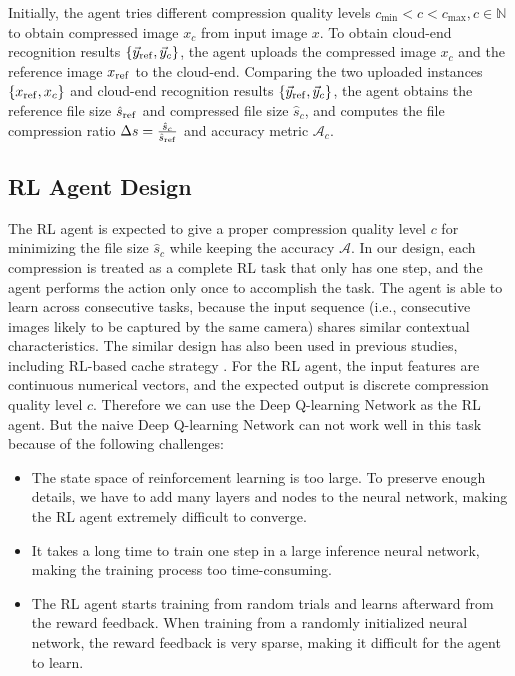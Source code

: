 Initially, the agent tries different compression quality levels $ c_{\min} < c < c_{\max}, c \in \mathbb{N} $ to obtain compressed image $ x_c $ from input image $ x $. To obtain cloud-end recognition results $ \{\vec{y}_{\rm ref}, \vec{y}_c\} $, the agent uploads the compressed image $ x_c $ and the reference image $ x_{\rm ref} $ to the cloud-end. Comparing the two uploaded instances $ \{x_{\rm ref}, x_c\} $ and cloud-end recognition results $ \{\vec{y}_{\rm ref}, \vec{y}_c\} $, the agent obtains the reference file size {\color{revise2}$ \hat{s}_{\rm ref} $} and compressed file size {\color{revise2}$ \hat{s}_c $}, and computes the file compression ratio {\color{revise2}$ \Delta s = \frac{\hat{s}_c}{\hat{s}_{\rm ref}} $} and accuracy metric $ \mathcal{A}_c $.

\subsection{RL Agent Design}

The RL agent is expected to give a proper compression quality level $ c $ for minimizing the file size {\color{revise2}$ \hat{s}_c $} while keeping the accuracy $ \mathcal{A} $. {\color{revise2} In our design, each compression is treated as a complete RL task that only has one step, and the agent performs the action only once to accomplish the task. The agent is able to learn across consecutive tasks, because the input sequence (i.e., consecutive images likely to be captured by the same camera) shares similar contextual characteristics. The similar design has also been used in previous studies, including RL-based cache strategy \cite{wang2020intelligent_RL,zhong2018deep_RL,sadeghi2019deep_RL}.} For the RL agent, the input features are continuous numerical vectors, and the expected output is discrete compression quality level $ c $. Therefore we can use the Deep Q-learning Network as the RL agent. But the naive Deep Q-learning Network can not work well in this task because of the following challenges: %

\begin{itemize}
	\item The state space of reinforcement learning is too large. To preserve enough details, we have to add many layers and nodes to the neural network, making the RL agent extremely difficult to converge. 
	\item It takes a long time to train one step in a large inference neural network, making the training process too time-consuming.
	\item The RL agent starts training from random trials and learns afterward from the reward feedback. When training from a randomly initialized neural network, the reward feedback is very sparse, making it difficult for the agent to learn.
\end{itemize}

